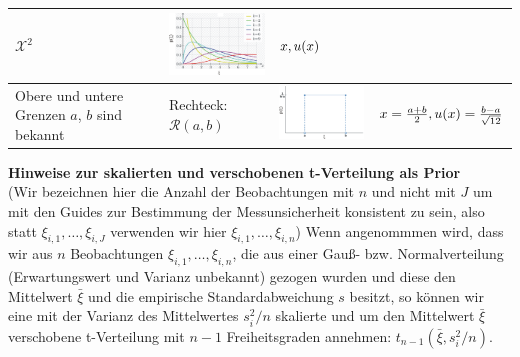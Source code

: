 \begin{table}[!htbp]
\begin{tabular}{m{3cm} |m{3cm} m{4.5cm}| m{3cm}}
	 $\mathcal{X}^2 $ & 
	 \includegraphics[width=40mm]{08_vorlesung/media/Prior_Chi2verteilung.png}
	 & $x, \newline u(x) $ \\
	  \hline \vspace*{4ex}
	Obere und untere Grenzen $a$, $b$ sind bekannt \vspace*{4ex} &
	Rechteck: $\mathcal{R}(a,b)$ & 
	\includegraphics[width=40mm]{08_vorlesung/media/Prior_Rechteckverteilung.png}
	& $x = \frac{a+b}{2}, \newline u(x)=\frac{b-a}{\sqrt{12}} $ \\			 
				 
		\hline 
	\end{tabular}
	\label{tab:Einige_Priors}
\end{table}

\newpage
\textbf{Hinweise zur skalierten und verschobenen t-Verteilung als Prior} \\
(Wir bezeichnen hier die Anzahl der Beobachtungen mit $n$ und nicht mit $J$ um mit den Guides
zur Bestimmung der Messunsicherheit konsistent zu sein, also statt $\xi_{i,1}, \dots, \xi_{i,J}$ verwenden wir hier $\xi_{i,1}, \dots, \xi_{i,n}$)
Wenn angenommmen wird, dass wir aus $n$ Beobachtungen  $\xi_{i,1},\ldots,\xi_{i,n}$, die aus einer Gauß- bzw.
Normalverteilung (Erwartungswert und Varianz unbekannt) gezogen wurden und diese den Mittelwert $\bar{\xi}$
und die empirische Standardabweichung $s$ besitzt,  
so können wir eine mit der Varianz des Mittelwertes $s_i^2/n$ skalierte und 
um den Mittelwert $\bar \xi$ verschobene t-Verteilung mit $n-1$ Freiheitsgraden
annehmen: $t_{n-1}(\bar \xi, s_i^2/n)$.

